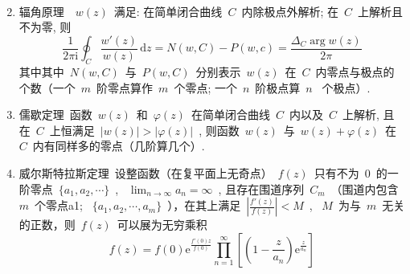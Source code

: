 \documentclass[11pt,a4paper]{article}
\newcommand\diff{\,\mathrm{d}}
\renewcommand{\m}[1]{~$\displaystyle#1$~}
\newcommand\mi{\mathrm{i}}
\newcommand\e{\mathrm{e}}
\begin{document}
\begin{enumerate}
\begin{eqnarray*}
          \end{eqnarray*}
      \item 辐角原理~\m{w(z)}满足: 在简单闭合曲线\m{C}内除极点外解析; 在\m{C}上解析且不为零, 则
        $$\frac 1{2\pi\mi}\oint_C \frac {w'(z)}{w(z)}\diff z = N(w,C) - P(w,c) = \frac {\Delta_C \arg w(z)}{2\pi}$$
        其中其中\m{N(w,C)}与\m{P(w,C)}分别表示\m{w(z)}在\m{C}内零点与极点的个数（一个\m{m}阶零点算作\m{m}个零点; 一个\m{n}阶极点算\m{n} 个极点）.
      \item 儒歇定理~函数\m{w(z)}和\m{\varphi(z)}在简单闭合曲线\m{C}内以及\m{C}上解析, 且在\m{C}上恒满足\m{|w(z)| > |\varphi(z)|}, 则函数\m{w(z)}与\m{w(z) + \varphi(z)}在\m{C}内有同样多的零点（几阶算几个）.
      \item 威尔斯特拉斯定理~设整函数（在复平面上无奇点）\m{f(z)}只有不为\m{0}的一阶零点\m{\{a_1,a_2,\cdots\}}, \m{\lim_{n\to\infty}a_n = \infty}, 且存在围道序列\m{C_m}（围道内包含\m{m}个零点a1; \m{\{a_1,a_2,\cdots,a_m\}}），在其上满足\m{\left|\frac{f'(z)}{f(z)}\right| < M}, \m{M}为与\m{m}无关的正数，则\m{f(z)}可以展为无穷乘积
          $$f(z)= f(0)\e^{\frac {f'(0)z}{f(0)}}\prod_{n=1}^{\infty}\left[(1-\frac z{a_n})\e^{\frac z{a_n}}\right]$$
    \end{enumerate}
  \newcommand\psif{\mathrm{\uppsi}}
\end{document}
